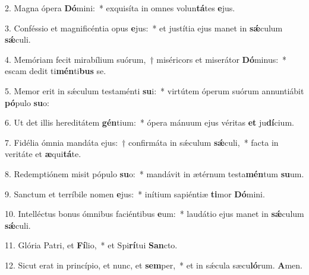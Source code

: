 \item 2. Magna ópera \textbf{Dó}mini:~* exquisíta in omnes volun\textbf{tá}tes \textbf{e}jus.
\item 3. Conféssio et magnificéntia opus \textbf{e}jus:~* et justítia ejus manet in \textbf{sǽ}culum \textbf{sǽ}culi.
\item 4. Memóriam fecit mirabílium suórum,~† miséricors et miserátor \textbf{Dó}minus:~* escam dedit ti\textbf{mén}ti\textbf{bus} se.
\item 5. Memor erit in sǽculum testaménti \textbf{su}i:~* virtútem óperum suórum annuntiábit \textbf{pó}pulo \textbf{su}o:
\item 6. Ut det illis hereditátem \textbf{gén}tium:~* ópera mánuum ejus véritas \textbf{et} ju\textbf{dí}cium.
\item 7. Fidélia ómnia mandáta ejus:~† confirmáta in sǽculum \textbf{sǽ}culi,~* facta in veritáte et \textbf{æ}qui\textbf{tá}te.
\item 8. Redemptiónem misit pópulo \textbf{su}o:~* mandávit in ætérnum testa\textbf{mén}tum \textbf{su}um.
\item 9. Sanctum et terríbile nomen \textbf{e}jus:~* inítium sapiéntiæ \textbf{ti}mor \textbf{Dó}mini.
\item 10. Intelléctus bonus ómnibus faciéntibus \textbf{e}um:~* laudátio ejus manet in \textbf{sǽ}culum \textbf{sǽ}culi.
\item 11. Glória Patri, et \textbf{Fí}lio,~* et Spi\textbf{rí}tui \textbf{San}cto.
\item 12. Sicut erat in princípio, et nunc, et \textbf{sem}per,~* et in sǽcula sæcu\textbf{ló}rum. \textbf{A}men.
